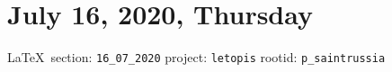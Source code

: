  
 

\section{July 16, 2020, Thursday}

\vspace{0.5cm}
{\small\LaTeX~section: \verb|16_07_2020| project: \verb|letopis| rootid: \verb|p_saintrussia|}
\vspace{0.5cm}


